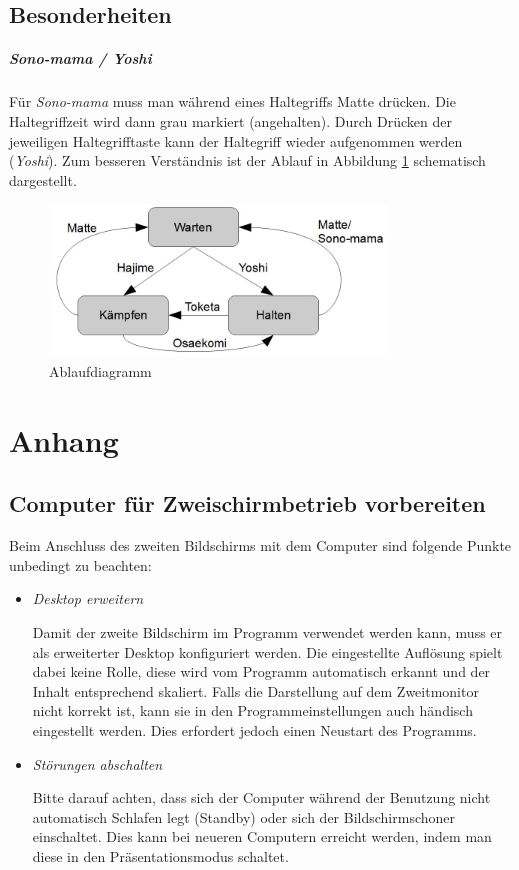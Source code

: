 ﻿\documentclass[11pt,numbers=noenddot]{scrreprt}
\begin{document}
\section[Besonderheiten]{Besonderheiten}
\paragraph{Sono-mama / Yoshi}
Für \emph{Sono-mama} muss man während eines Haltegriffs Matte drücken. Die Haltegriffzeit wird dann grau markiert (angehalten). Durch Drücken der jeweiligen Haltegrifftaste kann der Haltegriff wieder aufgenommen werden (\emph{Yoshi}). Zum besseren Verständnis ist der Ablauf in Abbildung \ref{fig:Ablaufdiagramm} schematisch dargestellt.
\begin{figure}[h]
	\centering
		\includegraphics[width=0.8\textwidth]{images/Ablaufdiagramm.jpg}
	\caption{Ablaufdiagramm}
	\label{fig:Ablaufdiagramm}
\end{figure}

\chapter{Anhang}
\section[Computer für Zweischirmbetrieb vorbereiten]{Computer für Zweischirmbetrieb vorbereiten}
\label{bkm:AnhangDualView}
Beim Anschluss des zweiten Bildschirms mit dem Computer sind folgende Punkte unbedingt zu beachten:
\begin{itemize}
	\item \textit{Desktop erweitern}
	
	Damit der zweite Bildschirm im Programm verwendet werden kann, muss er als erweiterter Desktop konfiguriert werden. Die eingestellte Auflösung spielt dabei keine Rolle, diese wird vom Programm automatisch erkannt und der Inhalt entsprechend skaliert. Falls die Darstellung auf dem Zweitmonitor nicht korrekt ist, kann sie in den Programmeinstellungen auch händisch eingestellt werden. Dies erfordert jedoch einen Neustart des Programms.

	\item \textit{Störungen abschalten}
	
	Bitte darauf achten, dass sich der Computer während der Benutzung nicht automatisch Schlafen legt (Standby) oder sich der Bildschirmschoner einschaltet. Dies kann bei neueren Computern erreicht werden, indem man diese in den Präsentationsmodus schaltet.
\end{itemize}
\end{document}
